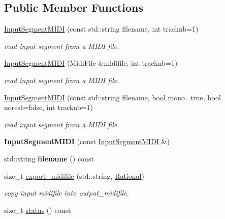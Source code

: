 \subsection*{Public Member Functions}
\begin{DoxyCompactItemize}
\item 
\mbox{\hyperlink{classInputSegmentMIDI_a8ae9a7a113d9b3fec0643cf8773a69df}{Input\+Segment\+M\+I\+DI}} (const std\+::string filename, int tracknb=1)
\begin{DoxyCompactList}\small\item\em read input segment from a M\+I\+DI file. \end{DoxyCompactList}\item 
\mbox{\hyperlink{classInputSegmentMIDI_ad337626161ab1a2ff80a4d845421a9f6}{Input\+Segment\+M\+I\+DI}} (Midi\+File \&midifile, int tracknb=1)
\begin{DoxyCompactList}\small\item\em read input segment from a M\+I\+DI file. \end{DoxyCompactList}\item 
\mbox{\hyperlink{classInputSegmentMIDI_a97c065fd510e9a925e12e44b6378f394}{Input\+Segment\+M\+I\+DI}} (const std\+::string filename, bool mono=true, bool norest=false, int tracknb=1)
\begin{DoxyCompactList}\small\item\em read input segment from a M\+I\+DI file. \end{DoxyCompactList}\item 
\mbox{\label{classInputSegmentMIDI_a6a5548fa47cfe652b80b0e7dcfcf9735}} 
{\bfseries Input\+Segment\+M\+I\+DI} (const \mbox{\hyperlink{classInputSegmentMIDI}{Input\+Segment\+M\+I\+DI}} \&)
\item 
\mbox{\label{classInputSegmentMIDI_a55fbf779b44ae82b17bad1f2839c8c78}} 
std\+::string {\bfseries filename} () const
\item 
size\+\_\+t \mbox{\hyperlink{classInputSegmentMIDI_a936c91d6d4d71d1e968808064455e9d4}{export\+\_\+midifile}} (std\+::string, \mbox{\hyperlink{classRational}{Rational}})
\begin{DoxyCompactList}\small\item\em copy input midifile into output\+\_\+midifile. \end{DoxyCompactList}\item 
size\+\_\+t \mbox{\hyperlink{classInputSegmentMIDI_a647bb0ebc71484c531c13ded3a86839c}{status}} () const

\end{DoxyCompactItemize}
